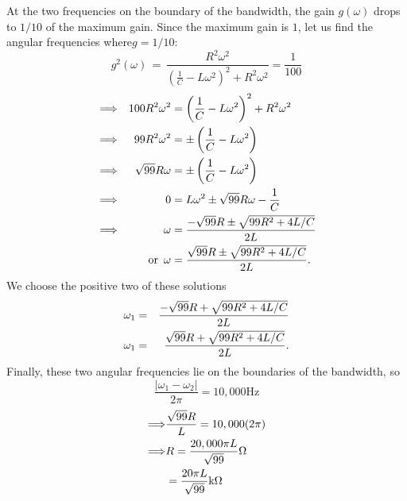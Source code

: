 \begin{enumerate}
  At the two frequencies on the boundary of the bandwidth, the gain $g(\omega)$ drops to
  $1/10$ of the maximum gain.
  Since the maximum gain is $1$, let us find the angular frequencies where$g=1/10$:
  \begin{equation*}
    \displaystyle g^2(\omega )\, =
    \, \frac{R^2\omega ^2}{\left(\frac{1}{C}-L\omega ^2\right)^2+R^2\omega ^2}
    \displaystyle = \displaystyle \frac{1}{100}  
  \end{equation*}
  \begin{align*}
    &\displaystyle \Longrightarrow &100R^2 \omega^2
                                     \displaystyle
    &=
      \displaystyle \left(\frac{1}{C}-L\omega ^2\right)^2+R^2\omega ^2 \\
    &\displaystyle \Longrightarrow &99R^2 \omega^2
                                     \displaystyle
    &=
      \displaystyle \pm \left(\frac{1}{C}-L\omega ^2\right) \\
    &\displaystyle \Longrightarrow &\sqrt {99} R\omega
                                     \displaystyle
    &=
      \displaystyle \pm \left(\frac{1}{C}-L\omega ^2\right)  \\
    &\displaystyle \Longrightarrow &0 
                                     \displaystyle
    &=
      \displaystyle  L\omega ^2\pm \sqrt {99} R\omega -\frac{1}{C} \\
    &\displaystyle \Longrightarrow &\omega 
                                     \displaystyle
    &=
      \displaystyle  \displaystyle \frac{-\sqrt {99}R\pm \sqrt { 99R^2+4L/C}}{ 2L}\\
    & &\displaystyle \text {or }\, \omega
        \displaystyle
    &= \displaystyle \frac{\sqrt {99}R\pm \sqrt { 99R^2+4L/C}}{ 2L}.\\
  \end{align*}
  We choose the positive two of these solutions
  \begin{eqnarray*}
    \displaystyle  \displaystyle \omega _1
    \displaystyle
    &=& \displaystyle \frac{-\sqrt {99}R+ \sqrt { 99R^2+4L/C}}{ 2L} \\
    \displaystyle  \displaystyle \omega _1
    \displaystyle
    &=& \displaystyle \frac{\sqrt {99}R+ \sqrt { 99R^2+4L/C}}{ 2L}.
  \end{eqnarray*}
  Finally, these two angular frequencies lie on the boundaries of the bandwidth, so
  \begin{equation*}
    \displaystyle \frac{|\omega _1-\omega _2|}{2\pi }
    \displaystyle =
    \displaystyle 10,000\text {Hz}
  \end{equation*}
  \begin{align*}
    \displaystyle \Longrightarrow
    \displaystyle &\frac{\sqrt {99}R}{L}
                    \displaystyle  = \displaystyle 10,000(2\pi ) \\
    \displaystyle \Longrightarrow
    \displaystyle &R
                    \displaystyle =
                    \displaystyle \frac{20,000\pi L}{\sqrt {99}} \Omega \\
    \displaystyle &=
                    \displaystyle  \frac{20\pi L}{\sqrt {99}} \text {k}\Omega
  \end{align*}
\end{enumerate}

\clearpage

